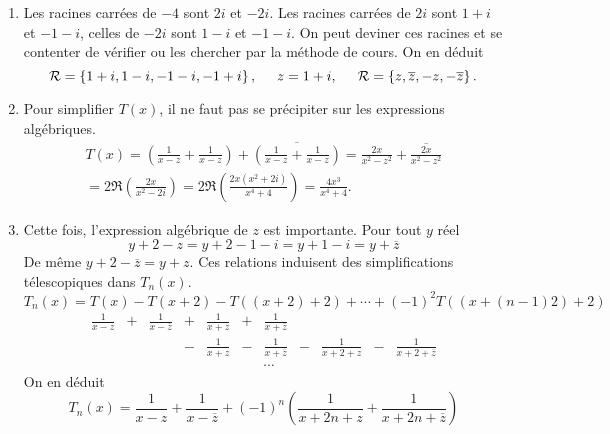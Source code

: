 \begin{enumerate}
 \item Les racines carrées de $-4$ sont $2i$ et $-2i$. Les racines carrées de $2i$ sont $1+i$ et $-1-i$, celles de $-2i$ sont $1-i$ et $-1-i$. On peut deviner ces racines et se contenter de vérifier ou les chercher par la méthode de cours. On en déduit
 \begin{displaymath}
\mathcal{R} = \left\lbrace  1+i, 1-i, -1-i, -1 +i\right\rbrace, \hspace{0.5cm} z = 1+i, \hspace{0.5cm}
\mathcal{R} = \left\lbrace  z, \overline{z}, -z, -\overline{z}\right\rbrace.
 \end{displaymath}

 \item Pour simplifier $T(x)$, il ne faut pas se précipiter sur les expressions algébriques.
\begin{multline*}
 T(x) = \left( \frac{1}{x-z} + \frac{1}{x-z}\right) + \overline{\left( \frac{1}{x-z} + \frac{1}{x-z}\right)}
 = \frac{2x}{x^2-z^2} + \overline{\frac{2x}{x^2-z^2}}\\
 = 2\Re\left( \frac{2x}{x^2-2i}\right) 
 = 2\Re\left( \frac{2x(x^2+2i)}{x^4 + 4}\right)
 = \frac{4x^3}{x^4 + 4}.
\end{multline*}

 \item Cette fois, l'expression algébrique de $z$ est importante. Pour tout $y$ réel
\begin{displaymath}
 y+2-z = y + 2 -1 -i = y + 1 -i = y + \overline{z} 
\end{displaymath}
De même $y+2-\overline{z} = y + z$.\newline
Ces relations induisent des simplifications télescopiques dans $T_n(x)$.
\begin{displaymath}
 T_n(x) = T(x) - T(x+2) - T((x+2) +2) + \cdots + (-1)^2T((x+(n-1)2)+2) 
\end{displaymath}
\begin{align*}
 \frac{1}{x - z} & + & \frac{1}{x - \overline{z}} & + & \frac{1}{x + z} &+& \frac{1}{x + \overline{z}} & &                  & &\\
                 &   &                            & - & \frac{1}{x + z} &-& \frac{1}{x + \overline{z}} &-&\frac{1}{x+2 + z} &-&\frac{1}{x+2 + \overline{z}} \\
                 &   &                            &   &                                                & & \cdots
\end{align*}
On en déduit
\begin{displaymath}
 T_n(x) =
\frac{1}{x - z}  +  \frac{1}{x - \overline{z}} 
+(-1)^n\left( \frac{1}{x+2n + z} + \frac{1}{x+2n + \overline{z}}\right) 
\end{displaymath}


\end{enumerate}

